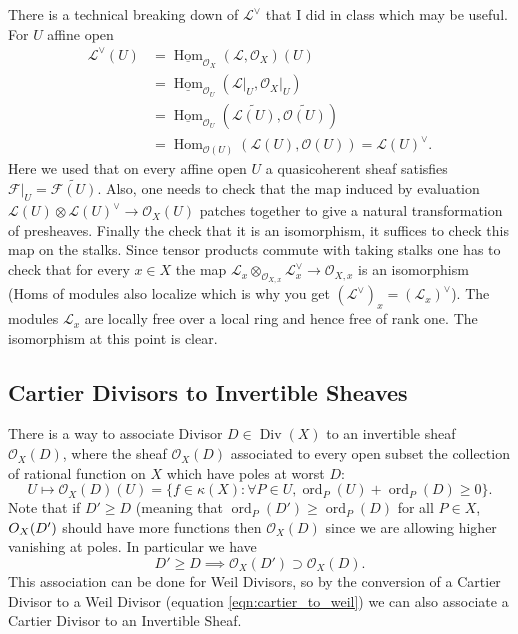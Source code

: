 \documentclass[12pt]{article}
\numberwithin{equation}{section}
\theoremstyle{definition}
\theoremstyle{remark}
\newcommand{\Hom}{\operatorname{Hom}}
\newcommand{\Ocal}{\mathcal{O}}
\newcommand{\ord}{\operatorname{ord}}
\newcommand{\Div}{\operatorname{Div}}
\newcommand{\Lcal}{\mathcal{L}}
\newcommand{\Fcal}{\mathcal{F}}
\begin{document}
There is a technical breaking down of $\Lcal^{\vee}$ that I did in class which may be useful. 
For $U$ affine open
\begin{align*}
  \Lcal^{\vee}(U) &= \underline{\Hom}_{\Ocal_X}(\Lcal,\Ocal_X)(U) \\
  &= \underline{\Hom}_{\Ocal_U}(\Lcal\vert_U, \Ocal_X\vert_U)\\
  &= \underline{\Hom}_{\Ocal_U}(\widetilde{\Lcal(U)},\widetilde{\Ocal(U)})\\
  &= \Hom_{\Ocal(U)}(\Lcal(U),\Ocal(U)) = \Lcal(U)^{\vee}.
\end{align*}
Here we used that on every affine open $U$ a quasicoherent sheaf satisfies $\Fcal\vert_U = \widetilde{\Fcal(U)}$.
Also, one needs to check that the map induced by evaluation $\Lcal(U)\otimes\Lcal(U)^{\vee} \to \Ocal_X(U)$ patches together to give a natural transformation of presheaves. 
Finally the check that it is an isomorphism, it suffices to check this map on the stalks. 
Since tensor products commute with taking stalks one has to check that for every $x\in X$ the map $\Lcal_x\otimes_{\Ocal_{X,x}} \Lcal^{\vee}_x \to \Ocal_{X,x}$ is an isomorphism (Homs of modules also localize which is why you get $(\Lcal^{\vee})_x = (\Lcal_x)^{\vee}$). 
The modules $\Lcal_x$ are locally free over a local ring and hence free of rank one. 
The isomorphism at this point is clear.


\subsection{Cartier Divisors to Invertible Sheaves}

There is a way to associate Divisor $D\in\Div(X)$ to an invertible sheaf $\Ocal_X(D)$, where the sheaf $\Ocal_X(D)$ associated to every open subset the collection of rational function on $X$ which have poles at worst $D$:
$$U \mapsto \Ocal_X(D)(U) = \lbrace f\in \kappa(X) : \forall P\in U, \ord_P(U)+\ord_P(D) \geq 0 \rbrace.$$
Note that if $D'\geq D$ (meaning that $\ord_P(D')\geq \ord_P(D)$ for all $P\in X$, $\mathcal \Ocal_X(D')$ should have more functions then $\Ocal_X(D)$ since we are allowing higher vanishing at poles. In particular we have
$$D'\geq D \implies \Ocal_X(D') \supset \Ocal_X(D).$$
This association can be done for Weil Divisors, so by the conversion of a Cartier Divisor to a Weil Divisor (equation \ref{eqn:cartier_to_weil}) we can also associate a Cartier Divisor to an Invertible Sheaf. 
\end{document}
